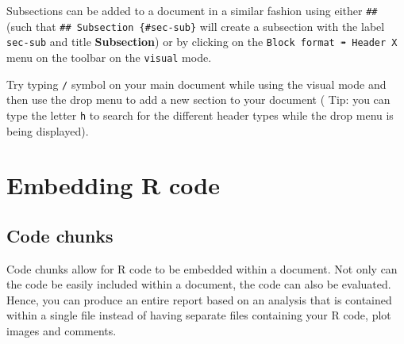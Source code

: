 \documentclass[
  letterpaper,
  DIV=11,
  numbers=noendperiod]{scrartcl}
\begin{document}
\begin{tcolorbox}[enhanced jigsaw, colback=white, toprule=.15mm, arc=.35mm, colbacktitle=quarto-callout-note-color!10!white, titlerule=0mm, colframe=quarto-callout-note-color-frame, title=\textcolor{quarto-callout-note-color}{\faInfo}\hspace{0.5em}{Note}, bottomtitle=1mm, toptitle=1mm, coltitle=black, rightrule=.15mm, opacityback=0, bottomrule=.15mm, breakable, leftrule=.75mm, left=2mm, opacitybacktitle=0.6]

Subsections can be added to a document in a similar fashion using either
\texttt{\#\#} (such that \texttt{\#\#\ Subsection\ \{\#sec-sub\}} will
create a subsection with the label \texttt{sec-sub} and title
\textbf{Subsection}) or by clicking on the
\texttt{Block\ format\ ➠\ Header\ X} menu on the toolbar on the
\texttt{visual} mode.

\end{tcolorbox}

\begin{tcolorbox}[enhanced jigsaw, colback=white, toprule=.15mm, arc=.35mm, colbacktitle=quarto-callout-warning-color!10!white, titlerule=0mm, colframe=quarto-callout-warning-color-frame, title={Task}, bottomtitle=1mm, toptitle=1mm, coltitle=black, rightrule=.15mm, opacityback=0, bottomrule=.15mm, breakable, leftrule=.75mm, left=2mm, opacitybacktitle=0.6]

Try typing \texttt{/} symbol on your main document while using the
visual mode and then use the drop menu to add a new section to your
document ( Tip: you can type the letter \texttt{h} to search for the
different header types while the drop menu is being displayed).

\end{tcolorbox}

\hypertarget{embedding-r-code}{%
\section{Embedding R code}\label{embedding-r-code}}

\hypertarget{code-chunks}{%
\subsection{Code chunks}\label{code-chunks}}

Code chunks allow for R code to be embedded within a document. Not only
can the code be easily included within a document, the code can also be
evaluated. Hence, you can produce an entire report based on an analysis
that is contained within a single file instead of having separate files
containing your R code, plot images and comments.
\end{document}

